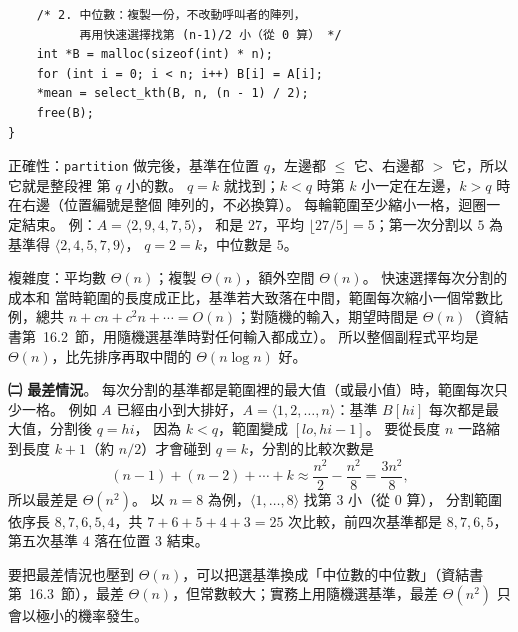 \begin{pastsoln}
\begin{verbatim}
    /* 2. 中位數：複製一份，不改動呼叫者的陣列，
          再用快速選擇找第 (n-1)/2 小（從 0 算） */
    int *B = malloc(sizeof(int) * n);
    for (int i = 0; i < n; i++) B[i] = A[i];
    *mean = select_kth(B, n, (n - 1) / 2);
    free(B);
}
\end{verbatim}
正確性：\texttt{partition} 做完後，基準在位置 $q$，左邊都 $\le$ 它、右邊都 $>$ 它，所以它就是整段裡
第 $q$ 小的數。 $q = k$ 就找到；$k < q$ 時第 $k$ 小一定在左邊，$k > q$ 時在右邊（位置編號是整個
陣列的，不必換算）。 每輪範圍至少縮小一格，迴圈一定結束。 例：$A = \langle 2, 9, 4, 7, 5\rangle$，
和是 $27$，平均 $\lfloor 27/5 \rfloor = 5$；第一次分割以 $5$ 為基準得 $\langle 2, 4, 5, 7, 9\rangle$，
$q = 2 = k$，中位數是 $5$。

複雜度：平均數 $\Theta(n)$；複製 $\Theta(n)$，額外空間 $\Theta(n)$。 快速選擇每次分割的成本和
當時範圍的長度成正比，基準若大致落在中間，範圍每次縮小一個常數比例，總共 $n + cn + c^2 n + \cdots =
O(n)$；對隨機的輸入，期望時間是 $\Theta(n)$（資結書第~16.2~節，用隨機選基準時對任何輸入都成立）。
所以整個副程式平均是 $\Theta(n)$，比先排序再取中間的 $\Theta(n \log n)$ 好。

\textbf{㈡ 最差情況}。 每次分割的基準都是範圍裡的最大值（或最小值）時，範圍每次只少一格。 例如
$A$ 已經由小到大排好，$A = \langle 1, 2, \ldots, n\rangle$：基準 $B[hi]$ 每次都是最大值，分割後 $q = hi$，
因為 $k < q$，範圍變成 $[lo, hi - 1]$。 要從長度 $n$ 一路縮到長度 $k + 1$（約 $n/2$）才會碰到
$q = k$，分割的比較次數是
\[
(n - 1) + (n - 2) + \cdots + k \approx \frac{n^2}{2} - \frac{n^2}{8} = \frac{3n^2}{8},
\]
所以最差是 $\Theta(n^2)$。 以 $n = 8$ 為例，$\langle 1, \ldots, 8\rangle$ 找第 $3$ 小（從 $0$ 算），
分割範圍依序長 $8, 7, 6, 5, 4$，共 $7 + 6 + 5 + 4 + 3 = 25$ 次比較，前四次基準都是 $8, 7, 6, 5$，
第五次基準 $4$ 落在位置 $3$ 結束。

要把最差情況也壓到 $\Theta(n)$，可以把選基準換成「中位數的中位數」（資結書第~16.3~節），最差
$\Theta(n)$，但常數較大；實務上用隨機選基準，最差 $\Theta(n^2)$ 只會以極小的機率發生。
\end{pastsoln}

